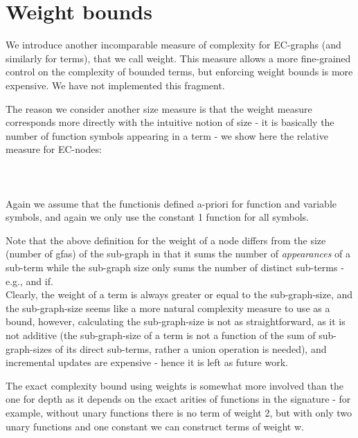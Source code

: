 \section{Weight bounds}\label{appendix:weight_bounds}
We introduce another incomparable measure of complexity for EC-graphs (and similarly for terms), that we call weight.
This measure allows a more fine-grained control on the complexity of bounded terms, but enforcing weight bounds is more expensive.
We have not implemented this fragment.

The reason we consider another size measure is that the weight measure corresponds more directly with the intuitive notion of size - it is basically the number of function symbols appearing in a term - we show here the relative measure  for EC-nodes:\\
\\
\\
\\
Again we assume that the functionis defined a-priori for function and variable symbols, and again we only use the constant 1 function for all symbols.

Note that the above definition for the weight of a node differs from the size (number of gfas) of the sub-graph in that it sums the number of \emph{appearances} of a sub-term while the sub-graph size  only sums the number of distinct sub-terms - e.g., and if. \\
Clearly, the weight of a term is always greater or equal to the sub-graph-size, and the sub-graph-size seems like a more natural complexity measure to use as a bound, however, calculating the sub-graph-size is not as straightforward, as it is not additive (the sub-graph-size of a term is not a function of the sum of sub-graph-sizes of its direct sub-terms, rather a union operation is needed), and incremental updates are expensive - hence it is left as future work.

The exact complexity bound using weights is somewhat more involved than the one for depth as it depends on the exact arities of functions in the signature - for example, without unary functions there is no term of weight 2, but with only two unary functions and one constant we can construct  terms of weight w.

